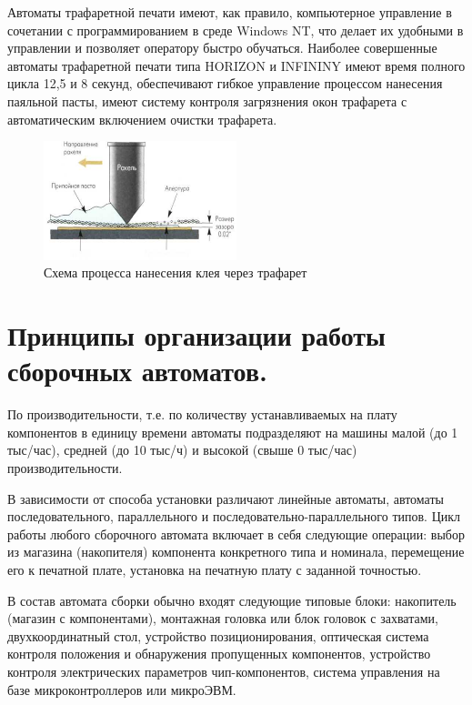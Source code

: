 \documentclass[unicode, 12pt, a4paper, oneside]{article}
\begin{document}
Автоматы трафаретной печати имеют, как правило, компьютерное управление в сочетании с программированием в среде Windows NT, что делает их удобными в управлении и позволяет оператору быстро обучаться. Наиболее совершенные автоматы трафаретной печати типа HORIZON и INFININY имеют время полного цикла 12,5 и 8 секунд, обеспечивают гибкое управление процессом нанесения паяльной пасты, имеют систему контроля загрязнения окон трафарета с автоматическим включением очистки трафарета.

\begin{figure}[htbp]
\centering
\includegraphics[width=0.5\textwidth]{87_tprint.png}
\caption{Схема процесса нанесения клея через трафарет}
\label{fig:87_tprint}
\end{figure}


\section{Принципы организации работы сборочных автоматов.}

По производительности, т.е. по количеству устанавливаемых на плату компонентов в единицу времени автоматы подразделяют на машины малой (до 1 тыс/час), средней (до 10 тыс/ч) и высокой (свыше 0 тыс/час) производительности.

В зависимости от способа установки различают линейные автоматы, автоматы последовательного, параллельного и последовательно-параллельного типов. Цикл работы любого сборочного автомата включает в себя следующие операции: выбор из магазина (накопителя) компонента конкретного типа и номинала, перемещение его к печатной плате, установка на печатную плату с заданной точностью.

В состав автомата сборки обычно входят следующие типовые блоки: накопитель (магазин с компонентами), монтажная головка или блок головок с захватами, двухкоординатный стол, устройство позиционирования, оптическая система контроля положения и обнаружения пропущенных компонентов, устройство контроля электрических параметров чип-компонентов, система управления на базе микроконтроллеров или микроЭВМ.
\end{document}
